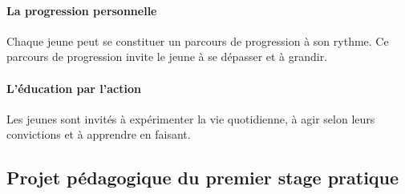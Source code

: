 \documentclass[titlepage,11pt,a4paper]{article}
\begin{document}
\paragraph{La progression personnelle} Chaque jeune peut se constituer un parcours
de progression à son rythme. Ce parcours de progression invite le jeune à se dépasser et à
grandir.

\paragraph{L'éducation par l'action} Les jeunes sont invités à expérimenter la vie
quotidienne, à agir selon leurs convictions et à apprendre en faisant.

\clearpage
\subsection{Projet pédagogique du premier stage pratique}
\end{document}
